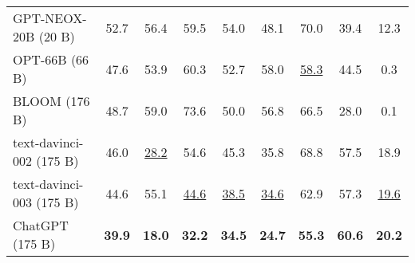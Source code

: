 \begin{table}[t!]
{\begin{tabular}{l|cccccc|cc}
GPT-NEOX-20B (20 B) & \multicolumn{1}{c}{52.7} & \multicolumn{1}{c}{56.4} & \multicolumn{1}{c}{59.5} & \multicolumn{1}{c}{54.0} & \multicolumn{1}{c}{48.1} & \multicolumn{1}{c|}{70.0}  & \multicolumn{1}{c}{39.4} & \multicolumn{1}{c}{12.3}  \\ 
OPT-66B (66 B) & \multicolumn{1}{c}{47.6} & \multicolumn{1}{c}{53.9} & \multicolumn{1}{c}{60.3} & \multicolumn{1}{c}{52.7} & \multicolumn{1}{c}{58.0} & \multicolumn{1}{c|}{\underline{58.3}} & \multicolumn{1}{c}{44.5} & \multicolumn{1}{c}{0.3} \\ 
BLOOM (176 B) & \multicolumn{1}{c}{48.7} & \multicolumn{1}{c}{59.0} & \multicolumn{1}{c}{73.6} & \multicolumn{1}{c}{50.0} & \multicolumn{1}{c}{56.8} & \multicolumn{1}{c|}{66.5}  & \multicolumn{1}{c}{28.0} & \multicolumn{1}{c}{0.1} \\ 
text-davinci-002 (175 B) & \multicolumn{1}{c}{46.0} & \multicolumn{1}{c}{\underline{28.2}} & \multicolumn{1}{c}{54.6} & \multicolumn{1}{c}{45.3} & \multicolumn{1}{c}{35.8} & \multicolumn{1}{c|}{68.8}  & \multicolumn{1}{c}{57.5} & \multicolumn{1}{c}{18.9}  \\ 
text-davinci-003 (175 B) & \multicolumn{1}{c}{44.6} & \multicolumn{1}{c}{55.1} & \multicolumn{1}{c}{\underline{44.6}} & \multicolumn{1}{c}{\underline{38.5}} & \multicolumn{1}{c}{\underline{34.6}} & \multicolumn{1}{c|}{62.9}  & \multicolumn{1}{c}{57.3} & \multicolumn{1}{c}{\underline{19.6}}  \\ 
ChatGPT (175 B) & \multicolumn{1}{c}{\textbf{39.9}} & \multicolumn{1}{c}{\textbf{18.0}} & \multicolumn{1}{c}{\textbf{32.2}} & \multicolumn{1}{c}{\textbf{34.5}} & \multicolumn{1}{c}{\textbf{24.7}} & \multicolumn{1}{c|}{\textbf{55.3}}  & \multicolumn{1}{c}{\textbf{60.6}} & \multicolumn{1}{c}{\textbf{20.2}} \\ \bottomrule
\end{tabular}
}
\end{table}
